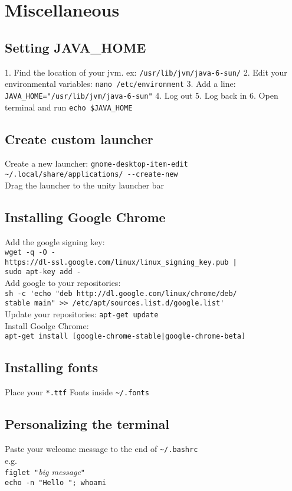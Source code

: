 \section{Miscellaneous}

\subsection{Setting JAVA\_HOME}
1. Find the location of your jvm. ex: \verb!/usr/lib/jvm/java-6-sun/!
2. Edit your environmental variables: \verb!nano /etc/environment!
3. Add a line: \verb!JAVA_HOME="/usr/lib/jvm/java-6-sun"!
4. Log out
5. Log back in
6. Open terminal and run \verb!echo $JAVA_HOME!

\subsection{Create custom launcher}
Create a new launcher: \verb!gnome-desktop-item-edit ~/.local/share/applications/ --create-new!\\
Drag the launcher to the unity launcher bar\\

\subsection{Installing Google Chrome}
Add the google signing key:\\
\verb!wget -q -O - !\\
\verb!https://dl-ssl.google.com/linux/linux_signing_key.pub |!\\ 
\verb!sudo apt-key add -!\\
Add google to your repositories:\\
\verb!sh -c 'echo "deb http://dl.google.com/linux/chrome/deb/!\\
\verb!stable main" >> /etc/apt/sources.list.d/google.list'!\\
Update your repositories: \verb!apt-get update!\\
Install Goolge Chrome:\\
\verb!apt-get install [google-chrome-stable|google-chrome-beta]!

\subsection{Installing fonts}
Place your \verb!*.ttf! Fonts inside \verb!~/.fonts!

\subsection{Personalizing the terminal}
Paste your welcome message to the end of \verb!~/.bashrc!\\
e.g.\\
\verb!figlet "!\textit{big message}\verb!"!\\
\verb!echo -n "Hello "; whoami!\\

